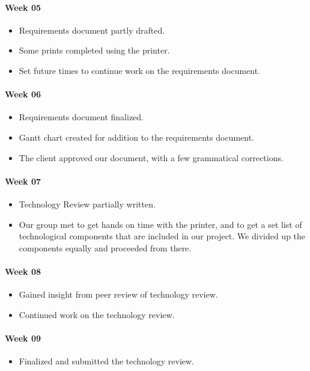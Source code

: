 \paragraph{Week 05}
\begin{itemize}
\item Requirements document partly drafted.
\item Some prints completed using the printer.
\item Set future times to continue work on the requirements document.
\end{itemize}
\paragraph{Week 06}
\begin{itemize}
\item Requirements document finalized.
\item Gantt chart created for addition to the requirements document.
\item The client approved our document, with a few grammatical corrections.
\end{itemize}
\paragraph{Week 07}
\begin{itemize}
\item Technology Review partially written.
\item Our group met to get hands on time with the printer, and to get a set list of technological components that are included in our project. We divided up the components equally and proceeded from there.
\end{itemize}
\paragraph{Week 08}
\begin{itemize}
\item Gained insight from peer review of technology review.
\item Continued work on the technology review.
\end{itemize}
\paragraph{Week 09}
\begin{itemize}
\item Finalized and submitted the technology review.
\end{itemize}
